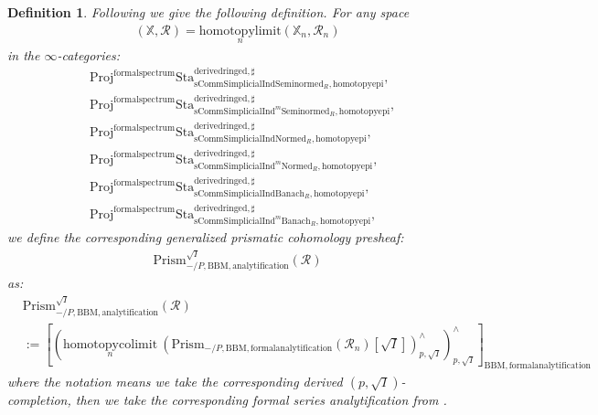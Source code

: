 \documentclass[12pt]{book}
\newtheorem{definition}{Definition}
\begin{document}
\begin{definition}
Following \cite[Construction 7.6]{BS} we give the following definition. For any space
\begin{align}
(\mathbb{X},\mathcal{R})=\underset{n}{\mathrm{homotopylimit}}(\mathbb{X}_n,\mathcal{R}_n)	
\end{align}
in the $\infty$-categories:
\begin{align}
&\mathrm{Proj}^\mathrm{formalspectrum}\mathrm{Sta}^\mathrm{derivedringed,\sharp}_{\mathrm{sComm}\mathrm{Simplicial}\mathrm{Ind}\mathrm{Seminormed}_R,\mathrm{homotopyepi}},\\
&\mathrm{Proj}^\mathrm{formalspectrum}\mathrm{Sta}^\mathrm{derivedringed,\sharp}_{\mathrm{sComm}\mathrm{Simplicial}\mathrm{Ind}^m\mathrm{Seminormed}_R,\mathrm{homotopyepi}},\\
&\mathrm{Proj}^\mathrm{formalspectrum}\mathrm{Sta}^\mathrm{derivedringed,\sharp}_{\mathrm{sComm}\mathrm{Simplicial}\mathrm{Ind}\mathrm{Normed}_R,\mathrm{homotopyepi}},\\
&\mathrm{Proj}^\mathrm{formalspectrum}\mathrm{Sta}^\mathrm{derivedringed,\sharp}_{\mathrm{sComm}\mathrm{Simplicial}\mathrm{Ind}^m\mathrm{Normed}_R,\mathrm{homotopyepi}},\\
&\mathrm{Proj}^\mathrm{formalspectrum}\mathrm{Sta}^\mathrm{derivedringed,\sharp}_{\mathrm{sComm}\mathrm{Simplicial}\mathrm{Ind}\mathrm{Banach}_R,\mathrm{homotopyepi}},\\
&\mathrm{Proj}^\mathrm{formalspectrum}\mathrm{Sta}^\mathrm{derivedringed,\sharp}_{\mathrm{sComm}\mathrm{Simplicial}\mathrm{Ind}^m\mathrm{Banach}_R,\mathrm{homotopyepi}},	
\end{align}
we define the corresponding generalized prismatic cohomology presheaf:
\begin{align}
\mathrm{Prism}^{\sqrt{I}}_{-/P,\mathrm{BBM},\mathrm{analytification}}(\mathcal{R})
\end{align}
as:
\begin{align}
&\mathrm{Prism}^{\sqrt{I}}_{-/P,\mathrm{BBM},\mathrm{analytification}}(\mathcal{R})\\
&:=\left[\left(\underset{n}{\mathrm{homotopycolimit}}~ (\mathrm{Prism}_{-/P,\mathrm{BBM},\mathrm{formalanalytification}}(\mathcal{R}_n)[\sqrt{I}])^\wedge_{p,\sqrt{I}}\right)^\wedge_{p,\sqrt{I}}\right]_{\mathrm{BBM},\mathrm{formalanalytification}}	
\end{align}
where the notation means we take the corresponding derived $(p,\sqrt{I})$-completion, then we take the corresponding formal series analytification from \cite[4.2]{BBM}.\\

\end{definition}
\end{document}
